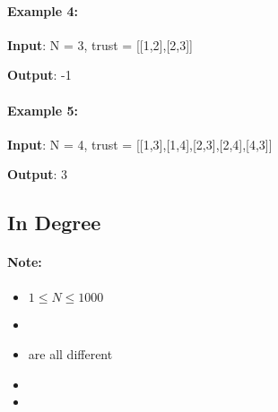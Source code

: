 \paragraph{Example 4:}

\begin{flushleft}
\textbf{Input}: N = 3, trust = [[1,2],[2,3]]

\textbf{Output}: -1
\end{flushleft}

\paragraph{Example 5:}
\begin{flushleft}


\textbf{Input}: N = 4, trust = [[1,3],[1,4],[2,3],[2,4],[4,3]]

\textbf{Output}: 3

\subsection{In Degree}

\end{flushleft}
 

\paragraph{Note:}

\begin{itemize}
\item $1 \leq N \leq 1000$
\item {}
\item {} are all different
\item {}
\item {}
\end{itemize}